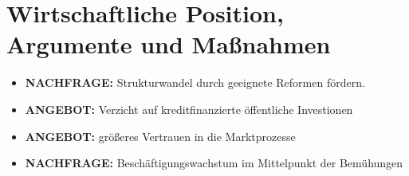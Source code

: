\documentclass[12pt,a4paper]{report}
\newcommand{\angebot}[0]{\color{blue}\textbf{ANGEBOT: }\color{black}}
\newcommand{\nachfrage}[0]{\color{red}\textbf{NACHFRAGE: }\color{black}}
\begin{document}
	\section{Wirtschaftliche Position, Argumente und Maßnahmen}
	\begin{itemize}
		\item \nachfrage Strukturwandel durch geeignete Reformen fördern.
		\item \angebot Verzicht auf kreditfinanzierte öffentliche Investionen
		\item \angebot größeres Vertrauen in die Marktprozesse
		\item \nachfrage Beschäftigungswachstum im Mittelpunkt der Bemühungen
	\end{itemize}
\end{document}
